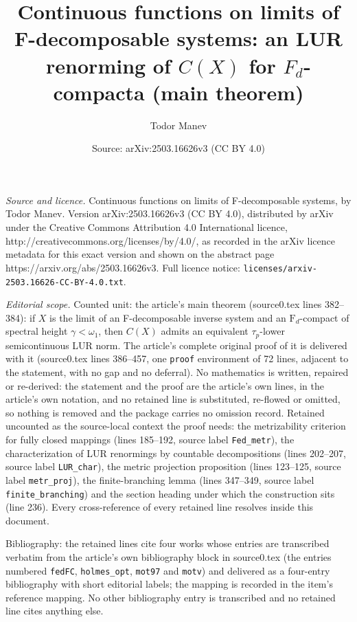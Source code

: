 \documentclass[10pt,a4paper]{amsart}
\title[main theorem]{Continuous functions on limits of F-decomposable systems: an LUR renorming of $C(X)$ for $F_d$-compacta (main theorem)}
\author{Todor Manev}
\date{Source: arXiv:2503.16626v3 (CC BY 4.0)}
\begin{document}
\maketitle

\noindent\emph{Source and licence.} Continuous functions on limits of F-decomposable systems, by Todor Manev. Version arXiv:2503.16626v3
(CC BY 4.0), distributed by arXiv under the Creative Commons Attribution 4.0 International licence,
http://creativecommons.org/licenses/by/4.0/, as recorded in the arXiv licence metadata for this exact
version and shown on the abstract page https://arxiv.org/abs/2503.16626v3. Full licence notice:
\texttt{licenses/arxiv-2503.16626-CC-BY-4.0.txt}.\par\smallskip

\noindent\textit{Editorial scope.} Counted unit: the article's main theorem (source0.tex lines 382--384): if $X$ is the limit of an F-decomposable inverse system and an $\mathrm{F}_d$-compact of spectral height $\gamma<\omega_1$, then $C(X)$ admits an equivalent $\tau_p$-lower semicontinuous LUR norm. The article's complete original proof of it is delivered with it (source0.tex lines 386--457, one \texttt{proof} environment of 72 lines, adjacent to the statement, with no gap and no deferral). No mathematics is written, repaired or re-derived: the statement and the proof are the article's own lines, in the article's own notation, and no retained line is substituted, re-flowed or omitted, so nothing is removed and the package carries no omission record. Retained uncounted as the source-local context the proof needs: the metrizability criterion for fully closed mappings (lines 185--192, source label \texttt{Fed\_metr}), the characterization of LUR renormings by countable decompositions (lines 202--207, source label \texttt{LUR\_char}), the metric projection proposition (lines 123--125, source label \texttt{metr\_proj}), the finite-branching lemma (lines 347--349, source label \texttt{finite\_branching}) and the section heading under which the construction sits (line 236). Every cross-reference of every retained line resolves inside this document.

Bibliography: the retained lines cite four works whose entries are transcribed verbatim from the article's own bibliography block in source0.tex (the entries numbered \texttt{fedFC}, \texttt{holmes\_opt}, \texttt{mot97} and \texttt{motv}) and delivered as a four-entry bibliography with short editorial labels; the mapping is recorded in the item's reference mapping. No other bibliography entry is transcribed and no retained line cites anything else.
\end{document}
